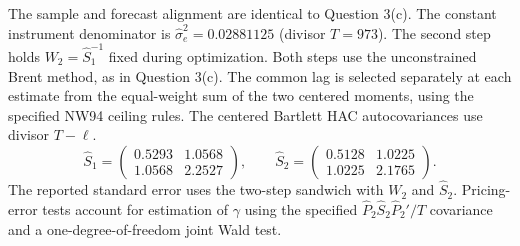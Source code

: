 The sample and forecast alignment are identical to Question 3(c).
The constant instrument denominator is $\hat\sigma_e^2=0.02881125$ (divisor $T=973$).
The second step holds $W_2=\hat S_1^{-1}$ fixed during optimization.
Both steps use the unconstrained Brent method, as in Question 3(c).
The common lag is selected separately at each estimate from the equal-weight sum
of the two centered moments, using the specified NW94 ceiling rules.
The centered Bartlett HAC autocovariances use divisor $T-\ell$.
\[
\hat S_1=\begin{pmatrix} 0.5293 & 1.0568 \\ 1.0568 & 2.2527 \end{pmatrix},\qquad \hat S_2=\begin{pmatrix} 0.5128 & 1.0225 \\ 1.0225 & 2.1765 \end{pmatrix}.
\]
The reported standard error uses the two-step sandwich with $W_2$ and $\hat S_2$.
Pricing-error tests account for estimation of $\gamma$ using the specified
$\hat P_2\hat S_2\hat P_2'/T$ covariance and a one-degree-of-freedom joint Wald test.
